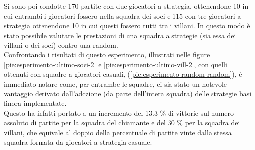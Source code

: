 Si sono poi condotte 170 partite con due giocatori a strategia, ottenendone 10 in cui entrambi i giocatori fossero nella squadra dei soci e 115 con tre giocatori a strategia ottenendone 10 in cui questi fossero tutti tra i villani.
In questo modo è stato possibile valutare le prestazioni di una squadra a strategie (sia essa dei villani o dei soci) contro una random.\\
Confrontando i risultati di questo esperimento, illustrati nelle figure \ref{pie:esperimento-ultimo-soci-2} e \ref{pie:esperimento-ultimo-vill-2}, con quelli ottenuti con squadre a giocatori casuali, (\ref{pie:esperimento-random-random}), è immediato notare come, per entrambe le squadre, ci sia stato un notevole vantaggio derivato dall'adozione (da parte dell'intera squadra) delle strategie basi finora implementate.
\\Questo ha infatti portato a un incremento del 13.3 \% di vittorie sul numero assoluto di partite per la squadra del chiamante e del 30 \% per la squadra dei villani, che equivale al doppio della percentuale di partite vinte dalla stessa squadra formata da giocatori a strategia casuale.








